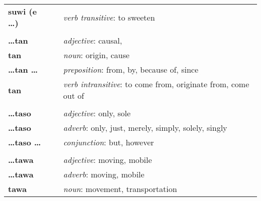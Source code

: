 \begin{supertabular}{p{2,5cm}|ll}
    \textbf{suwi (e \dots)}      &  & \textit{verb transitive}: to sweeten                                                                       \\
                                 &  &                                                                                                            \\ %
    \textbf{\dots tan}           &  & \textit{adjective}: causal,                                                                                \\
    \textbf{tan}                 &  & \textit{noun}: origin, cause                                                                               \\
    \textbf{\dots tan \dots}     &  & \textit{preposition}: from, by, because of, since                                                          \\
    \textbf{tan}                 &  & \textit{verb intransitive}: to come from, originate from, come out of                                      \\
                                 &  &                                                                                                            \\ %
    \textbf{\dots taso}          &  & \textit{adjective}: only, sole                                                                             \\
    \textbf{\dots taso}          &  & \textit{adverb}: only, just, merely, simply, solely, singly                                                \\
    \textbf{\dots taso \dots}    &  & \textit{conjunction}: but, however                                                                         \\
                                 &  &                                                                                                            \\ %
    \textbf{\dots tawa}          &  & \textit{adjective}: moving, mobile                                                                         \\
    \textbf{\dots tawa}          &  & \textit{adverb}: moving, mobile                                                                            \\
    \textbf{tawa}                &  & \textit{noun}: movement, transportation                                                                    \\

\end{supertabular}
